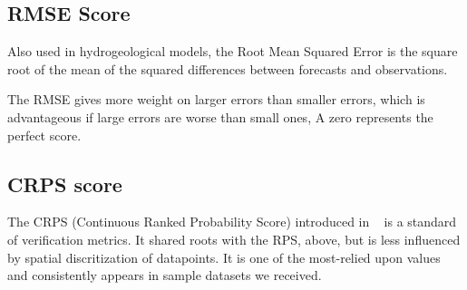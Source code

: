 \documentclass[logos,parttoc,morelanguage=french,morelanguage=german]{orsay-memoire}
\begin{document}
%
%

\subsection{RMSE Score}

Also used in hydrogeological models, the Root Mean Squared Error is the square root of the mean of the squared differences between forecasts and observations.

The RMSE gives more weight on larger errors than smaller errors, which is advantageous if large errors are worse than small ones, A zero represents the perfect score.


%
%


\subsection{CRPS score}

The CRPS (Continuous Ranked Probability Score) introduced in ~\autocite{hersbach2000decomposition} is a standard of verification metrics. It shared roots with the RPS, above, but is less influenced by spatial discritization of datapoints. It is one of the most-relied upon values and consistently appears in sample datasets we received.
\end{document}
